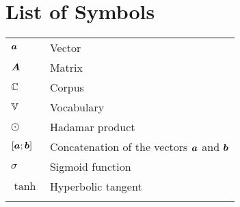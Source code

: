 \chapter{List of Symbols}
\begin{tabular}{ll}
\vspace{2mm}
$\bm{a}$    &Vector\\ \vspace{2mm}
$\bm{A}$    &Matrix\\ \vspace{2mm}
$\mathbb{C}$     &Corpus\\ \vspace{2mm}
$\mathbb{V}$      &Vocabulary \\ \vspace{2mm}
$\odot$       & Hadamar product \\ \vspace{2mm}
$[\bm{a}; \bm{b}]$ &Concatenation of the vectors $\bm{a}$ and $\bm{b}$ \\ \vspace{2mm}
$\sigma$ & Sigmoid function \\ \vspace{2mm}
$\tanh$ & Hyperbolic tangent \\ \vspace{2mm}
\end{tabular}
